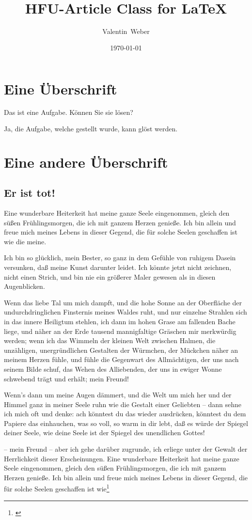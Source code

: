 \documentclass{hfu_article}
\title{HFU-Article Class for \LaTeX{}}
\author{Valentin~Weber}
\date{\today}
\begin{document}
\maketitle

\tableofcontents
\clearpage

\section{Eine Überschrift}

\begin{task}
    Das ist eine Aufgabe. Können Sie sie lösen?
\end{task}

Ja, die Aufgabe, welche gestellt wurde, kann glöst werden.

\section{Eine andere Überschrift}
\subsection{Er ist tot!}
Eine wunderbare Heiterkeit hat meine ganze Seele eingenommen, gleich den süßen Frühlingsmorgen, die ich mit ganzem Herzen genieße.
Ich bin allein und freue mich meines Lebens in dieser Gegend, die für solche Seelen geschaffen ist wie die meine.

Ich bin so glücklich, mein Bester, so ganz in dem Gefühle von ruhigem Dasein versunken, daß meine Kunst darunter leidet.
Ich könnte jetzt nicht zeichnen, nicht einen Strich, und bin nie ein größerer Maler gewesen als in diesen Augenblicken.

Wenn das liebe Tal um mich dampft, und die hohe Sonne an der Oberfläche der undurchdringlichen Finsternis meines Waldes ruht, und nur einzelne Strahlen sich in das innere Heiligtum stehlen, ich dann im hohen Grase am fallenden Bache liege, und näher an der Erde tausend mannigfaltige Gräschen mir merkwürdig werden; wenn ich das Wimmeln der kleinen Welt zwischen Halmen, die unzähligen, unergründlichen Gestalten der Würmchen, der Mückchen näher an meinem Herzen fühle, und fühle die Gegenwart des Allmächtigen, der uns nach seinem Bilde schuf, das Wehen des Alliebenden, der uns in ewiger Wonne schwebend trägt und erhält; mein Freund!

Wenn's dann um meine Augen dämmert, und die Welt um mich her und der Himmel ganz in meiner Seele ruhn wie die Gestalt einer Geliebten \--- dann sehne ich mich oft und denke: ach könntest du das wieder ausdrücken, könntest du dem Papiere das einhauchen, was so voll, so warm in dir lebt, daß es würde der Spiegel deiner Seele, wie deine Seele ist der Spiegel des unendlichen Gottes!

\--- mein Freund \--- aber ich gehe darüber zugrunde, ich erliege unter der Gewalt der Herrlichkeit dieser Erscheinungen. Eine wunderbare Heiterkeit hat meine ganze Seele eingenommen, gleich den süßen Frühlingsmorgen, die ich mit ganzem Herzen genieße. Ich bin allein und freue mich meines Lebens in dieser Gegend, die für solche Seelen geschaffen ist wie\footnote{\cite{vonGoethe2006}}

\clearpage

\printbibliography{}
\end{document}
